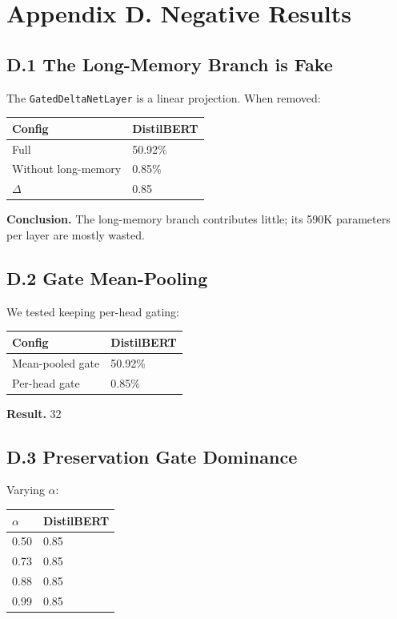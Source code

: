 
\section{Appendix D. Negative Results}

\subsection{D.1 The Long-Memory Branch is Fake}

The \texttt{GatedDeltaNetLayer} is a linear projection. When removed:

\begin{table}[H]
\centering
\small
\begin{tabular}{ll}
\toprule
\textbf{Config} & \textbf{DistilBERT} \\
\midrule
Full & 50.92\% \\
Without long-memory & 0.85\% \\
$\Delta$ & 0.85 \\
\bottomrule
\end{tabular}
\end{table}

\textbf{Conclusion.} The long-memory branch contributes little; its 590K 
parameters per layer are mostly wasted.

\subsection{D.2 Gate Mean-Pooling}

We tested keeping per-head gating:

\begin{table}[H]
\centering
\small
\begin{tabular}{ll}
\toprule
\textbf{Config} & \textbf{DistilBERT} \\
\midrule
Mean-pooled gate & 50.92\% \\
Per-head gate & 0.85\% \\
\bottomrule
\end{tabular}
\end{table}

\textbf{Result.} 32

\subsection{D.3 Preservation Gate Dominance}

Varying $\alpha$:

\begin{table}[H]
\centering
\small
\begin{tabular}{ll}
\toprule
\textbf{$\alpha$} & \textbf{DistilBERT} \\
\midrule
0.50 & 0.85 \\
0.73 & 0.85 \\
0.88 & 0.85 \\
0.99 & 0.85 \\
\bottomrule
\end{tabular}
\end{table}

